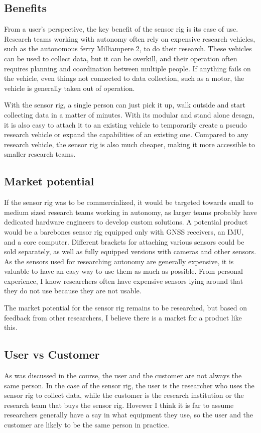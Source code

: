 \documentclass{iopconfser}
\begin{document}
\subsection*{Benefits}
From a user's perspective, the key benefit of the sensor rig is its ease of use.
Research teams working with autonomy often rely on expensive research vehicles, such as the autonomous ferry Milliampere 2, to do their research.
These vehicles can be used to collect data, but it can be overkill, and their operation often requires planning and coordination between multiple people.
If anything fails on the vehicle, even things not connected to data collection, such as a motor, the vehicle is generally taken out of operation.

With the sensor rig, a single person can just pick it up, walk outside and start collecting data in a matter of minutes.
With its modular and stand alone desagn, it is also easy to attach it to an existing vehicle to temporarily create a pseudo research vehicle or expand the capabilities of an existing one.
Compared to any research vehicle, the sensor rig is also much cheaper, making it more accessible to smaller research teams.

\subsection*{Market potential}
If the sensor rig was to be commercialized, it would be targeted towards small to medium sized research teams working in autonomy, as larger teams probably have dedicated hardware engineers to develop custom solutions.
A potential product would be a barebones sensor rig equipped only with GNSS receivers, an IMU, and a core computer.
Different brackets for attaching various sensors could be sold separately, as well as fully equipped versions with cameras and other sensors.
As the sensors used for researching autonomy are generally expensive, it is valuable to have an easy way to use them as much as possible.
From personal experience, I know researchers often have expensive sensors lying around that they do not use because they are not usable.

The market potential for the sensor rig remains to be researched, but based on feedback from other researchers, I believe there is a market for a product like this.

\subsection*{User vs Customer}
As was discussed in the course, the user and the customer are not always the same person.
In the case of the sensor rig, the user is the researcher who uses the sensor rig to collect data, while the customer is the research institution or the research team that buys the sensor rig.
Hovewer I think it is far to assume researchers generally have a say in what equipment they use, so the user and the customer are likely to be the same person in practice.
\end{document}
